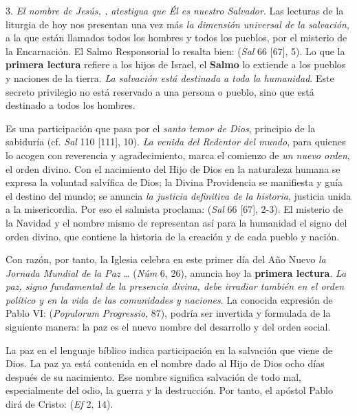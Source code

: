 \begin{body}
	3. \emph{El nombre de Jesús, , atestigua que Él es nuestro Salvador}. Las lecturas de la liturgia de hoy nos presentan una vez más \emph{la dimensión universal de la salvación}, a la que están llamados todos los hombres y todos los pueblos, por el misterio de la Encarnación. El Salmo Responsorial lo resalta bien:  (\emph{Sal} 66 {[}67{]}, 5). Lo que la \textbf{primera lectura} refiere a los hijos de Israel, el \textbf{Salmo} lo extiende a los pueblos y naciones de la tierra. \emph{La salvación está destinada a toda la humanidad}. Este secreto privilegio no está reservado a una persona o pueblo, sino que está destinado a todos los hombres.

	Es una participación que pasa por el \emph{santo temor de Dios}, principio de la sabiduría (cf. \emph{Sal} 110 {[}111{]}, 10). \emph{La venida del Redentor del mundo}, para quienes lo acogen con reverencia y agradecimiento, marca el comienzo de \emph{un nuevo orden}, el orden divino. Con el nacimiento del Hijo de Dios en la naturaleza humana se expresa la voluntad salvífica de Dios; la Divina Providencia se manifiesta y guía el destino del mundo; se anuncia \emph{la justicia definitiva de la historia}, justicia unida a la misericordia. Por eso el salmista proclama:  (\emph{Sal} 66 {[}67{]}, 2-3). El misterio de la Navidad y el nombre mismo de  representan así para la humanidad el signo del orden divino, que contiene la historia de la creación y de cada pueblo y nación.

	Con razón, por tanto, la Iglesia celebra en este primer día del Año Nuevo \emph{la Jornada Mundial de la Paz} \ldots{}  (\emph{Núm} 6, 26), anuncia hoy la \textbf{primera lectura}. \emph{La paz, signo fundamental de la presencia divina, debe irradiar también en el orden político y en la vida de las comunidades y naciones}. La conocida expresión de Pablo VI:  (\emph{Populorum Progressio}, 87), podría ser invertida y formulada de la siguiente manera: la paz es el nuevo nombre del desarrollo y del orden social.

	La paz en el lenguaje bíblico indica participación en la salvación que viene de Dios. La paz ya está contenida en el nombre dado al Hijo de Dios ocho días después de su nacimiento. Ese nombre significa salvación de todo mal, especialmente del odio, la guerra y la destrucción. Por tanto, el apóstol Pablo dirá de Cristo:  (\emph{Ef} 2, 14).


\end{body}

